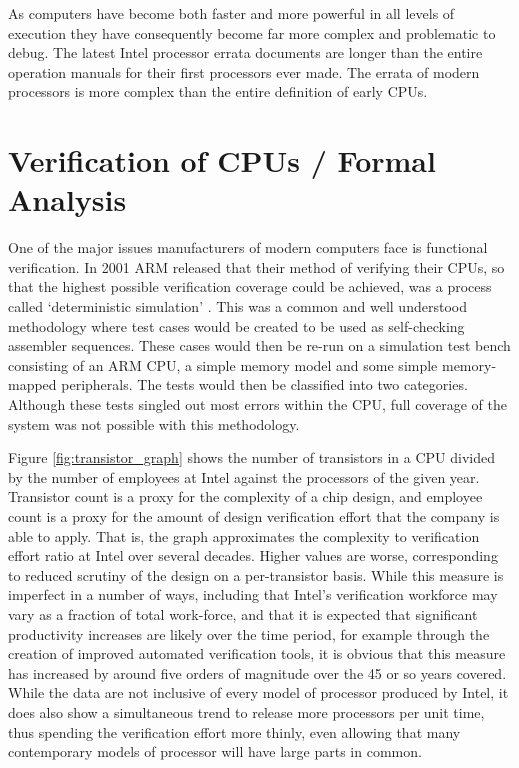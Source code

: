 As computers have become both faster and more powerful in all levels of execution they have consequently become far more complex and problematic to debug.
The latest Intel processor errata documents are longer than the entire operation manuals for their first processors ever made. The errata of modern processors is more complex than the entire definition of early CPUs.


\section{Verification of CPUs / Formal Analysis}

One of the major issues manufacturers of modern computers face is functional verification.
In 2001 ARM released that their method of verifying their CPUs, so that the highest possible verification coverage could be achieved, was a process called ‘deterministic simulation’ \cite{RN6}.
This was a common and well understood methodology where test cases would be created to be used as self-checking assembler sequences.
These cases would then be re-run on a simulation test bench consisting of an ARM CPU, a simple memory model and some simple memory-mapped peripherals.
The tests would then be classified into two categories.
Although these tests singled out most errors within the CPU, full coverage of the system was not possible with this methodology.

Figure \ref{fig:transistor_graph} shows the number of transistors in a CPU divided by the number of employees at Intel against the processors of the given year.
Transistor count is a proxy for the complexity of a chip design, and employee count is a proxy for the amount of design verification effort that the company is able to apply.
That is, the graph approximates the complexity to verification effort ratio at Intel over several decades.
Higher values are worse, corresponding to reduced scrutiny of the design on a per-transistor basis.
While this measure is imperfect in a number of ways, including that Intel’s verification workforce may vary as a fraction of total work-force, and that it is expected that significant productivity increases are likely over the time period, for example through the creation of improved automated verification tools, it is obvious that this measure has increased by around five orders of magnitude over the 45 or so years covered.
While the data are not inclusive of every model of processor produced by Intel, it does also show a simultaneous trend to release more processors per unit time, thus spending the verification effort more thinly, even allowing that many contemporary models of processor will have large parts in common.

